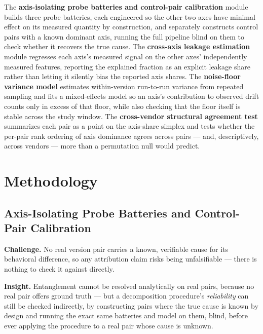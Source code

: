 \documentclass[11pt]{article}
\begin{document}
The \textbf{axis-isolating probe batteries and control-pair calibration} module builds three probe batteries, each engineered so the other two axes have minimal effect on its measured quantity by construction, and separately constructs control pairs with a known dominant axis, running the full pipeline blind on them to check whether it recovers the true cause. The \textbf{cross-axis leakage estimation} module regresses each axis's measured signal on the other axes' independently measured features, reporting the explained fraction as an explicit leakage share rather than letting it silently bias the reported axis shares. The \textbf{noise-floor variance model} estimates within-version run-to-run variance from repeated sampling and fits a mixed-effects model so an axis's contribution to observed drift counts only in excess of that floor, while also checking that the floor itself is stable across the study window. The \textbf{cross-vendor structural agreement test} summarizes each pair as a point on the axis-share simplex and tests whether the per-pair rank ordering of axis dominance agrees across pairs --- and, descriptively, across vendors --- more than a permutation null would predict.

\section{Methodology}

\subsection{Axis-Isolating Probe Batteries and Control-Pair Calibration}
\textbf{Challenge.} No real version pair carries a known, verifiable cause for its behavioral difference, so any attribution claim risks being unfalsifiable --- there is nothing to check it against directly.

\textbf{Insight.} Entanglement cannot be resolved analytically on real pairs, because no real pair offers ground truth --- but a decomposition procedure's \emph{reliability} can still be checked indirectly, by constructing pairs where the true cause is known by design and running the exact same batteries and model on them, blind, before ever applying the procedure to a real pair whose cause is unknown.
\end{document}
